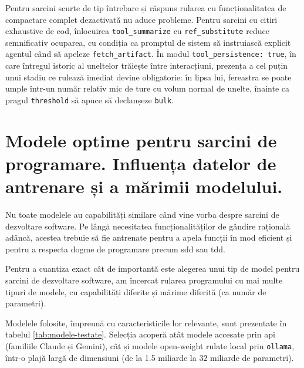 \documentclass[12pt, a4paper, oneside, romanian]{teza-upb}
\begin{document}
    Pentru sarcini scurte de tip întrebare și răspuns rularea cu funcționalitatea de compactare complet dezactivată nu aduce probleme. Pentru sarcini cu citiri exhaustive de cod, înlocuirea
    \texttt{tool\_summarize} cu \texttt{ref\_substitute} reduce semnificativ ocuparea, cu condiția ca promptul de sistem să instruiască explicit agentul când să apeleze \texttt{fetch\_artifact}.
    În modul \texttt{tool\_persistence: true}, în care întregul istoric al uneltelor trăiește între interacțiuni, prezența a cel puțin unui stadiu ce rulează imediat devine obligatorie: în lipsa lui, fereastra se poate umple
    într-un număr relativ mic de ture cu volum normal de unelte, înainte ca pragul \texttt{threshold} să apuce să declanșeze \texttt{bulk}.

  \section{Modele optime pentru sarcini de programare. Influența datelor de antrenare și a mărimii modelului.}

  Nu toate modelele au capabilități similare când vine vorba despre sarcini de dezvoltare software. Pe lângă necesitatea funcționalităților de gândire rațională adâncă, acestea trebuie
  să fie antrenate pentru a apela funcții în mod eficient și pentru a respecta dogme de programare precum \ac{sdd} sau \ac{tdd}.

  Pentru a cuantiza exact cât de importantă este alegerea unui tip de model pentru sarcini de dezvoltare software, am încercat rularea programului cu mai multe
  tipuri de modele, cu capabilități diferite și mărime diferită (ca număr de parametri).

  Modelele folosite, împreună cu caracteristicile lor relevante, sunt prezentate în tabelul \ref{tab:modele-testate}. Selecția acoperă atât
  modele accesate prin \ac{api} (familiile Claude și Gemini), cât și modele open-weight rulate local prin \texttt{ollama}, într-o
  plajă largă de dimensiuni (de la 1.5 miliarde la 32 miliarde de parametri).
\end{document}
